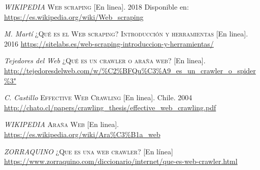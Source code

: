 \begin{thebibliography}{}
	\textit{WIKIPEDIA}
	\textsc{Web scraping} 
	[En linea]. 2018
	Disponible en:
	\url{https://es.wikipedia.org/wiki/Web_scraping}     

	\textit{M. Martí}
	\textsc{¿Qué es el Web scraping? Introducción y herramientas}
	[En linea]. 2016
	\url{https://sitelabs.es/web-scraping-introduccion-y-herramientas/}

	\textit{Tejedores del Web}
	\textsc{¿Qué es un crawler o araña web?}
	[En linea]. 
	\url{http://tejedoresdelweb.com/w/\%C2\%BFQu\%C3\%A9_es_un_crawler_o_spider\%3"}   
	     
	\textit{C. Castillo}
	\textsc{Effective Web Crawling}
	[En linea]. Chile. 2004
	\url{http://chato.cl/papers/crawling_thesis/effective_web_crawling.pdf}

	\textit{WIKIPEDIA}
	\textsc{Araña Web}
	[En linea].
	\url{https://es.wikipedia.org/wiki/Ara\%C3\%B1a_web}

	\textit{ZORRAQUINO}
	\textsc{¿Que es una web crawler?}
	[En línea]
	\url{https://www.zorraquino.com/diccionario/internet/que-es-web-crawler.html}
	
	
\end{thebibliography}
